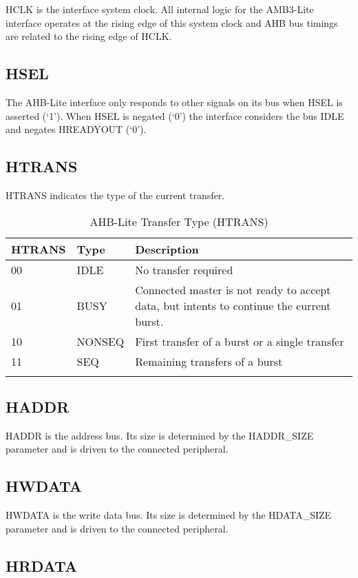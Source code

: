 HCLK is the interface system clock. All internal logic for the AMB3-Lite
interface operates at the rising edge of this system clock and AHB bus
timings are related to the rising edge of HCLK.

 \subsection{HSEL}\label{hsel}

The AHB-Lite interface only responds to other signals on its bus when
HSEL is asserted (`1'). When HSEL is negated (`0') the interface
considers the bus IDLE and negates HREADYOUT (`0').


 \subsection{HTRANS}\label{htrans}

HTRANS indicates the type of the current transfer.

\begin{longtable}[]{@{}llp{11cm}@{}}
	\toprule
	HTRANS & Type & Description\tabularnewline
	\midrule
	\endhead
	00 & IDLE & No transfer required\tabularnewline
	01 & BUSY & Connected master is not ready to accept data, but intents to
	continue the current burst.\tabularnewline
	10 & NONSEQ & First transfer of a burst or a single
	transfer\tabularnewline
	11 & SEQ & Remaining transfers of a burst\tabularnewline
	\bottomrule
	\caption{AHB-Lite Transfer Type (HTRANS)}
\end{longtable}

 \subsection{HADDR}\label{haddr}

HADDR is the address bus. Its size is determined by the HADDR\_SIZE
parameter and is driven to the connected peripheral.

 \subsection{HWDATA}\label{hwdata}

HWDATA is the write data bus. Its size is determined by the HDATA\_SIZE
parameter and is driven to the connected peripheral.

 \subsection{HRDATA}\label{hrdata}

